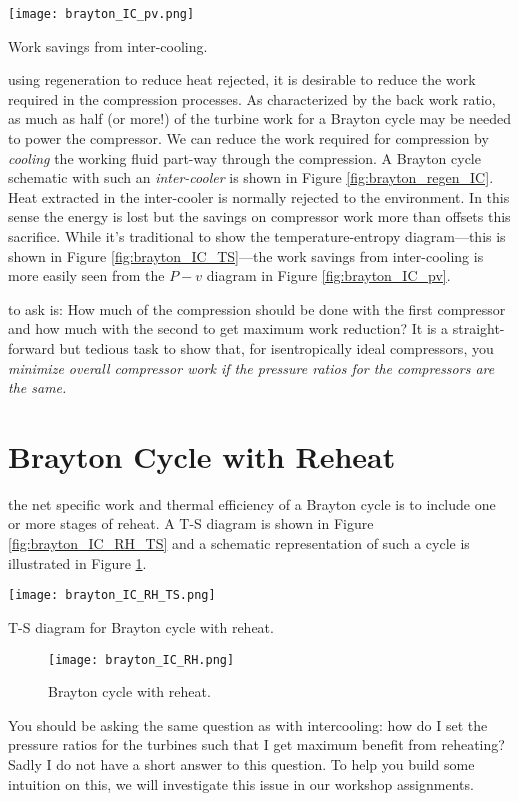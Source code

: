 \begin{marginfigure}
\texttt{[image: brayton\_IC\_pv.png]}
\caption{Work savings from inter-cooling.}
\label{fig:brayton_IC_pv}
\end{marginfigure}
 using regeneration to reduce heat rejected, it is desirable to reduce the work required in the compression processes.  As characterized by the back work ratio, as much as half (or more!) of the turbine work for a Brayton cycle may be needed to power the compressor.  We can reduce the work required for compression by \emph{cooling} the working fluid part-way through the compression.  A Brayton cycle schematic with such an \emph{inter-cooler} is shown in Figure \ref{fig:brayton_regen_IC}. Heat extracted in the inter-cooler is normally rejected to the environment.  In this sense the energy is lost but the savings on compressor work more than offsets this sacrifice.  While it's traditional to show the temperature-entropy diagram---this is shown in Figure \ref{fig:brayton_IC_TS}---the work savings from inter-cooling is more easily seen from the $P-v$ diagram in Figure \ref{fig:brayton_IC_pv}. 



 to ask is: How much of the compression should be done with the first compressor and how much with the second to get maximum work reduction?  It is a straight-forward but tedious task to show that, for isentropically ideal compressors, you \emph{minimize overall compressor work if the pressure ratios for the compressors are the same.}  


\section{Brayton Cycle with Reheat}


 the net specific work and thermal efficiency of a Brayton cycle is to include one or more stages of reheat.  A T-S diagram is shown in Figure \ref{fig:brayton_IC_RH_TS} and a schematic representation of such a cycle is illustrated in Figure \ref{fig:brayton_IC_RH}.
\begin{marginfigure}
\texttt{[image: brayton\_IC\_RH\_TS.png]}
\caption{T-S diagram for Brayton cycle with reheat.}
\label{fig:brayton_IC_RH_TS}
\end{marginfigure}

\begin{figure}
\texttt{[image: brayton\_IC\_RH.png]}
\caption{Brayton cycle with reheat.}
\label{fig:brayton_IC_RH}
\end{figure}

You should be asking the same question as with intercooling: how do I set the pressure ratios for the turbines such that I get maximum benefit from reheating?  Sadly I do not have a short answer to this question. To help you build some intuition on this, we will investigate this issue in our workshop assignments.


